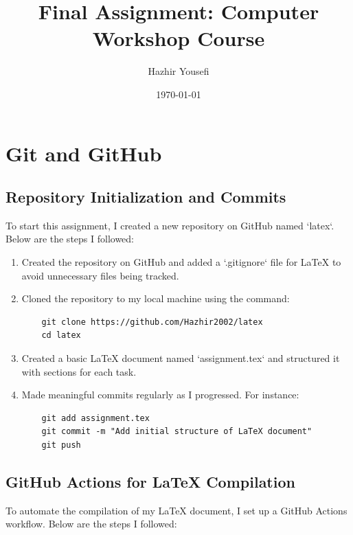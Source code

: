 \documentclass{article}
\title{Final Assignment: Computer Workshop Course}
\author{Hazhir Yousefi}
\date{\today}
\begin{document}
\maketitle

\tableofcontents

\section{Git and GitHub}
\subsection{Repository Initialization and Commits}
To start this assignment, I created a new repository on GitHub named `latex`. Below are the steps I followed:

\begin{enumerate}
    \item Created the repository on GitHub and added a `.gitignore` file for LaTeX to avoid unnecessary files being tracked.
    \item Cloned the repository to my local machine using the command:
    \begin{verbatim}
    git clone https://github.com/Hazhir2002/latex
    cd latex
    \end{verbatim}
    \item Created a basic LaTeX document named `assignment.tex` and structured it with sections for each task.
    \item Made meaningful commits regularly as I progressed. For instance:
    \begin{verbatim}
    git add assignment.tex
    git commit -m "Add initial structure of LaTeX document"
    git push
    \end{verbatim}
\end{enumerate}

\subsection{GitHub Actions for LaTeX Compilation}
To automate the compilation of my LaTeX document, I set up a GitHub Actions workflow. Below are the steps I followed:
\end{document}
